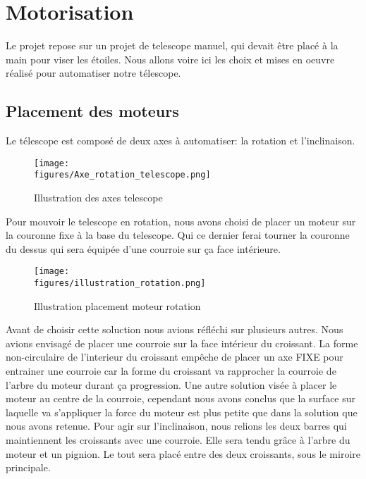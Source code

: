 \chapter{Motorisation}
\label{chapter1}

Le projet repose sur un projet de telescope manuel, qui devait être placé à la main pour viser les étoiles.
Nous allons voire ici les choix et mises en oeuvre réalisé pour automatiser notre télescope.

\section{Placement des moteurs}

Le télescope est composé de deux axes à automatiser: la rotation et l'inclinaison. 

\begin{figure}[H]
    \centering
	\texttt{[image: \\figures/Axe\_rotation\_telescope.png]}
    \decoRule
    \caption[
    Illustration des axes telescope]{
    Illustration des axes telescope}
    \label{fig:Illustration des axes telescope}
    \end{figure}

Pour mouvoir le telescope en rotation, nous avons choisi de placer un moteur sur la couronne fixe à la base du telescope. Qui ce dernier ferai tourner la couronne du dessus qui sera équipée d'une courroie sur ça face intérieure. 

\begin{figure}[H]
    \centering
	\texttt{[image: \\figures/illustration\_rotation.png]}
    \decoRule
    \caption[
    Illustration placement moteur rotation]{
    Illustration placement moteur rotation}
    \label{fig:Illustration placement moteur rotation}
    \end{figure}
    
Avant de choisir cette soluction nous avions réfléchi sur plusieurs autres. Nous avions envisagé de placer une courroie sur la face intérieur du croissant. La forme non-circulaire de l'interieur du croissant empêche de placer un axe FIXE pour entrainer une courroie car la forme du croissant va rapprocher la courroie de l'arbre du moteur durant ça progression.
Une autre solution visée à placer le moteur au centre de la courroie, cependant nous avons conclus que la surface sur laquelle va s'appliquer la force du moteur est plus petite que dans la solution que nous avons retenue.
\newline
\newline
Pour agir sur l'inclinaison, nous relions les deux barres qui maintiennent les croissants avec une courroie. Elle sera tendu grâce à l'arbre du moteur et un pignion. Le tout sera placé entre des deux croissants, sous le miroire principale.

